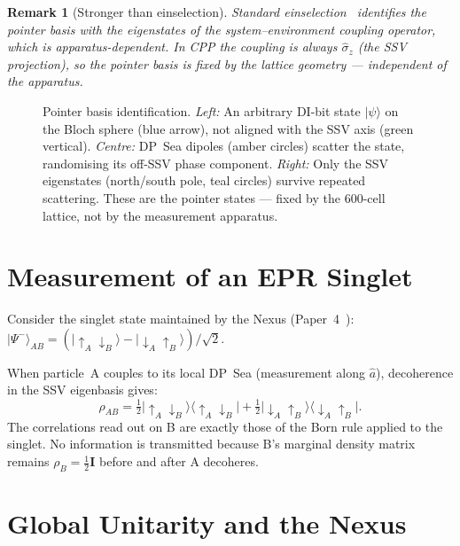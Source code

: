 \documentclass[11pt,a4paper]{article}
\newtheorem{remark}[theorem]{Remark}
\newcommand{\ket}[1]{|#1\rangle}
\begin{document}
\begin{remark}[Stronger than einselection]
Standard einselection~\cite{zurek1981} identifies the pointer basis
with the eigenstates of the system--environment coupling operator,
which is apparatus-dependent.  In CPP the coupling is always
$\hat{\sigma}_z$ (the SSV projection), so the pointer basis is fixed
by the lattice geometry --- independent of the apparatus.
\end{remark}

\begin{figure}[H]
\centering

\caption{Pointer basis identification.
  \textit{Left:} An arbitrary DI-bit state $\ket{\psi}$ on the
  Bloch sphere (blue arrow), not aligned with the SSV axis (green
  vertical).
  \textit{Centre:} DP~Sea dipoles (amber circles) scatter the state,
  randomising its off-SSV phase component.
  \textit{Right:} Only the SSV eigenstates (north/south pole, teal circles)
  survive repeated scattering.  These are the pointer states --- fixed
  by the 600-cell lattice, not by the measurement apparatus.}
\label{fig:pointer}
\end{figure}

\section{Measurement of an EPR Singlet}

Consider the singlet state maintained by the Nexus
(Paper~4~\cite{cpp2040c}):
$\ket{\Psi^-}_{AB} = (\ket{\uparrow_A\downarrow_B}
- \ket{\downarrow_A\uparrow_B})/\sqrt{2}$.

When particle~A couples to its local DP~Sea (measurement along
$\hat{a}$), decoherence in the SSV eigenbasis gives:
\begin{equation}
\rho_{AB} = \tfrac12\ket{\uparrow_A\downarrow_B}
\langle\uparrow_A\downarrow_B|
+ \tfrac12\ket{\downarrow_A\uparrow_B}
\langle\downarrow_A\uparrow_B|.
\label{eq:rhoAB}
\end{equation}
The correlations read out on B are exactly those of the Born rule
applied to the singlet.  No information is transmitted because B's
marginal density matrix remains $\rho_B = \tfrac12\mathbf{I}$
before and after A decoheres.

\section{Global Unitarity and the Nexus}
\end{document}
